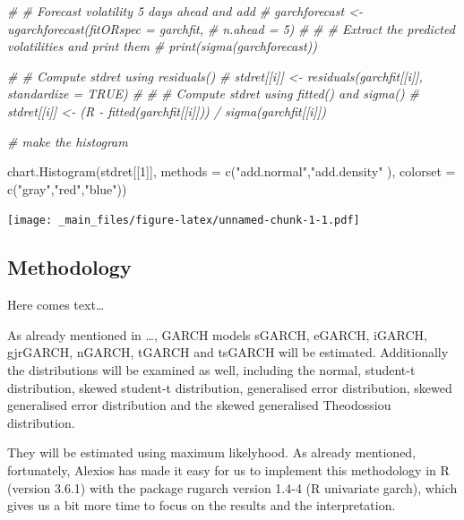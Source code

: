 \documentclass[a4paper, twoside]{templates/ociamthesis}
\newenvironment{Shaded}{\begin{snugshade}}{\end{snugshade}}
\newcommand{\AttributeTok}[1]{\textcolor[rgb]{0.77,0.63,0.00}{#1}}
\newcommand{\CommentTok}[1]{\textcolor[rgb]{0.56,0.35,0.01}{\textit{#1}}}
\newcommand{\DecValTok}[1]{\textcolor[rgb]{0.00,0.00,0.81}{#1}}
\newcommand{\FunctionTok}[1]{\textcolor[rgb]{0.00,0.00,0.00}{#1}}
\newcommand{\NormalTok}[1]{#1}
\newcommand{\StringTok}[1]{\textcolor[rgb]{0.31,0.60,0.02}{#1}}
\renewenvironment{Shaded}
{
  \vspace{10pt}%
  \begin{snugshade}%
}{%
  \end{snugshade}%
  \vspace{8pt}%
}
\begin{document}
\begin{Shaded}
\begin{Highlighting}[]
\CommentTok{\# \# Forecast volatility 5 days ahead and add }
\CommentTok{\# garchforecast \textless{}{-} ugarchforecast(fitORspec = garchfit, }
\CommentTok{\#                      n.ahead = 5)}
\CommentTok{\# }
\CommentTok{\# \# Extract the predicted volatilities and print them}
\CommentTok{\# print(sigma(garchforecast))}




\CommentTok{\# \# Compute stdret using residuals()}
\CommentTok{\# stdret[[i]] \textless{}{-} residuals(garchfit[[i]], standardize = TRUE)}
\CommentTok{\# }
\CommentTok{\# \# Compute stdret using fitted() and sigma()}
\CommentTok{\# stdret[[i]] \textless{}{-} (R {-} fitted(garchfit[[i]])) / sigma(garchfit[[i]])}






\CommentTok{\#  make the histogram}

\FunctionTok{chart.Histogram}\NormalTok{(stdret[[}\DecValTok{1}\NormalTok{]], }\AttributeTok{methods =} \FunctionTok{c}\NormalTok{(}\StringTok{"add.normal"}\NormalTok{,}\StringTok{"add.density"}\NormalTok{ ), }
                \AttributeTok{colorset =} \FunctionTok{c}\NormalTok{(}\StringTok{"gray"}\NormalTok{,}\StringTok{"red"}\NormalTok{,}\StringTok{"blue"}\NormalTok{))}
\end{Highlighting}
\end{Shaded}

\texttt{[image: \_main\_files/figure-latex/unnamed-chunk-1-1.pdf]}

\newpage

\hypertarget{methodology}{%
\subsection{Methodology}\label{methodology}}

Here comes text\ldots{}

As already mentioned in \ldots, GARCH models sGARCH, eGARCH, iGARCH, gjrGARCH, nGARCH, tGARCH and tsGARCH will be estimated. Additionally the distributions will be examined as well, including the normal, student-t distribution, skewed student-t distribution, generalised error distribution, skewed generalised error distribution and the skewed generalised Theodossiou distribution.

They will be estimated using maximum likelyhood. As already mentioned, fortunately, Alexios \textcite{alexios2020} has made it easy for us to implement this methodology in R (version 3.6.1) with the package rugarch version 1.4-4 (R univariate garch), which gives us a bit more time to focus on the results and the interpretation.
\end{document}
